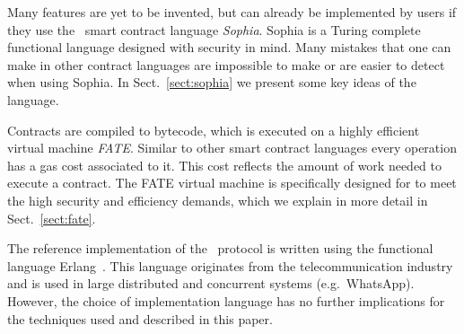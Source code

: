 Many features are yet to be invented, but can already be implemented
by users if they use the \aet\ smart contract language
\textit{Sophia}. Sophia is a Turing complete functional language
designed with security in mind. Many mistakes that one can make in
other contract languages are impossible to make or are easier to detect
when using Sophia. In Sect.\ \ref{sect:sophia} we present some key
ideas of the language.

Contracts are compiled to bytecode, which is executed on a highly
efficient virtual machine \textit{FATE}. Similar to other smart contract
languages every operation has a gas cost associated to it. This cost reflects
the amount of work needed to execute a contract. The FATE virtual machine is
specifically designed for
\aet to meet the high security and efficiency demands, which we
explain in more detail in Sect.~\ref{sect:fate}.

The reference implementation of the \aet\ protocol is written using the
functional language Erlang~\cite{Armstrong:2010:ERL:1810891.1810910}. This
language originates from the telecommunication industry and is used in large
distributed and concurrent systems (e.g.\ WhatsApp). However, the choice
of implementation language has no further implications for the techniques used
and described in this paper.
